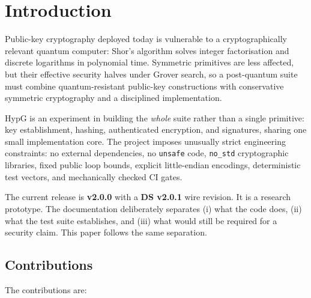 \documentclass[11pt,a4paper]{article}
\theoremstyle{plain}
\theoremstyle{definition}
\theoremstyle{remark}
\begin{document}
\section{Introduction}
\label{sec:intro}

Public-key cryptography deployed today is vulnerable to a
cryptographically relevant quantum computer: Shor's algorithm solves
integer factorisation and discrete logarithms in polynomial time.
Symmetric primitives are less affected, but their effective security
halves under Grover search, so a post-quantum suite must combine
quantum-resistant public-key constructions with conservative symmetric
cryptography and a disciplined implementation.

HypG is an experiment in building the \emph{whole} suite rather than a
single primitive: key establishment, hashing, authenticated encryption,
and signatures, sharing one small implementation core.  The project
imposes unusually strict engineering constraints: no external
dependencies, no \texttt{unsafe} code, \texttt{no\_std} cryptographic
libraries, fixed public loop bounds, explicit little-endian encodings,
deterministic test vectors, and mechanically checked CI gates.

The current release is \textbf{v2.0.0} with a \textbf{DS v2.0.1} wire
revision.  It is a research prototype.  The documentation deliberately
separates (i) what the code does, (ii) what the test suite establishes,
and (iii) what would still be required for a security claim.  This
paper follows the same separation.

\subsection{Contributions}

The contributions are:
\end{document}
